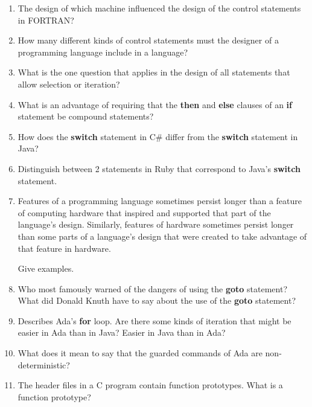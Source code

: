 \documentclass{article}
\begin{document}
\begin{enumerate}
  \item The design of which machine influenced the design
    of the control statements in FORTRAN?

  \item How many different kinds of control statements
    must the designer of a programming language include
    in a language?

  \item What is the one question that applies in the
    design of all statements that allow selection or
    iteration?

  \item What is an advantage of requiring that
    the \textbf{then} and \textbf{else} clauses of
    an \textbf{if} statement be compound statements?

  \item How does the \textbf{switch} statement in C\#
    differ from the \textbf{switch} statement in Java?

  \item Distinguish between 2 statements in Ruby
    that correspond to Java's \textbf{switch} statement.

  \item Features of a programming language sometimes persist
    longer than a feature of computing hardware that inspired
    and supported that part of the language's design.
    Similarly, features of hardware sometimes persist longer
    than some parts of a language's design that were created
    to take advantage of that feature in hardware.

    Give examples.

  \item Who most famously warned of the dangers of using the
    \textbf{goto} statement? What did Donald Knuth have to
    say about the use of the \textbf{goto} statement?

  \item Describes Ada's \textbf{for} loop. Are there some
    kinds of iteration that might be easier in Ada than
    in Java? Easier in Java than in Ada?

  \item What does it mean to say that the guarded commands
    of Ada are non-deterministic?

  \item The header files in a C program contain function
    prototypes. What is a function prototype?


\end{enumerate}
\end{document}
